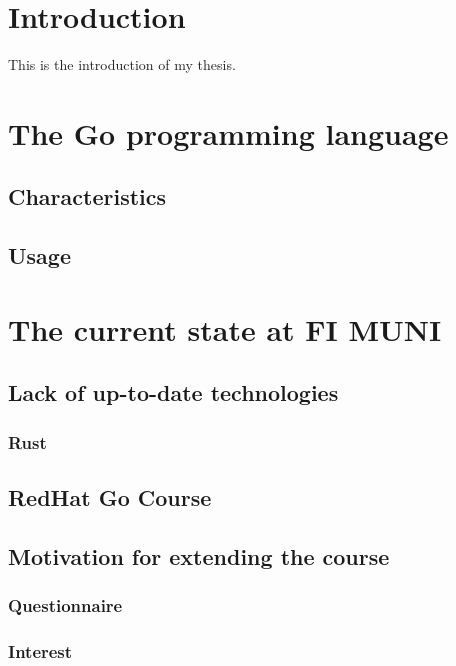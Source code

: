 \documentclass[
  digital,
  color,
  oneside,
  nosansbold,
  nocolorbold,
  lof,
  lot,
]{fithesis4}
\begin{document}
\chapter{Introduction}

This is the introduction of my thesis.

\chapter{The Go programming language}

\section{Characteristics}

\section{Usage}

\chapter{The current state at FI MUNI}

\section{Lack of up-to-date technologies}

\subsection{Rust}

\section{RedHat Go Course}

\section{Motivation for extending the course}

\subsection{Questionnaire}

\subsection{Interest}
\end{document}
